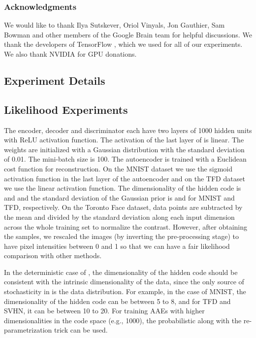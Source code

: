 \documentclass{article}
\begin{document}
\subsubsection*{Acknowledgments}
We would like to thank Ilya Sutskever, Oriol Vinyals, Jon Gauthier, Sam Bowman and other members of the Google Brain team for helpful discussions. We thank the developers of TensorFlow \citep{tensorflow2015-whitepaper}, which we used for all of our experiments. We also thank NVIDIA for GPU donations. 





\begin{appendices}


\section{Experiment Details}\label{exp:details}

\subsection{Likelihood Experiments}
The encoder, decoder and discriminator each have two layers of 1000 hidden units with ReLU activation function. The activation of the last layer of  is linear. 
The weights are initialized with a Gaussian distribution with the standard deviation of 0.01. 
The mini-batch size is 100.
The autoencoder is trained with a Euclidean cost function for reconstruction.
On the MNIST dataset we use the sigmoid activation function in the last layer of the autoencoder and on the TFD dataset we use the linear activation function.
The dimensionality of the hidden code  is  and  and the standard deviation of the Gaussian prior is  and  for MNIST and TFD, respectively. On the Toronto Face dataset, data points are subtracted by the mean and divided by the standard deviation along each input dimension across the whole training set to normalize the contrast. However, after obtaining the samples, we rescaled the images (by inverting the pre-processing stage) to have pixel intensities between 0 and 1 so that we can have a fair likelihood comparison with other methods.

In the deterministic case of , the dimensionality of the hidden code should be consistent with the intrinsic dimensionality of the data, since the only source of stochasticity in  is the data distribution. For example, in the case of MNIST, the dimensionality of the hidden code can be between 5 to 8, and for TFD and SVHN, it can be between 10 to 20. For training AAEs with higher dimensionalities in the code space (e.g., 1000), the probabilistic  along with the re-parametrization trick can be used.


\end{appendices}
\end{document}
